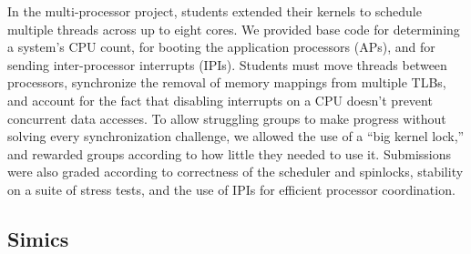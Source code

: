 In the multi-processor project, students extended their kernels to schedule multiple threads across up to eight cores.
We provided base code for determining a system's CPU count, for booting the application processors (APs), and for sending inter-processor interrupts (IPIs).
Students must move threads between processors,
synchronize the removal of memory mappings from multiple TLBs,
and account for the fact that disabling interrupts on a CPU doesn't prevent concurrent data accesses.
To allow struggling groups to make progress without solving every synchronization challenge, we allowed the use of a ``big kernel lock,'' and rewarded groups according to how little they needed to use it.
Submissions were also graded according to
correctness of the scheduler and spinlocks,
stability on a suite of stress tests,
and the use of IPIs for efficient processor coordination.

\subsection{Simics}

